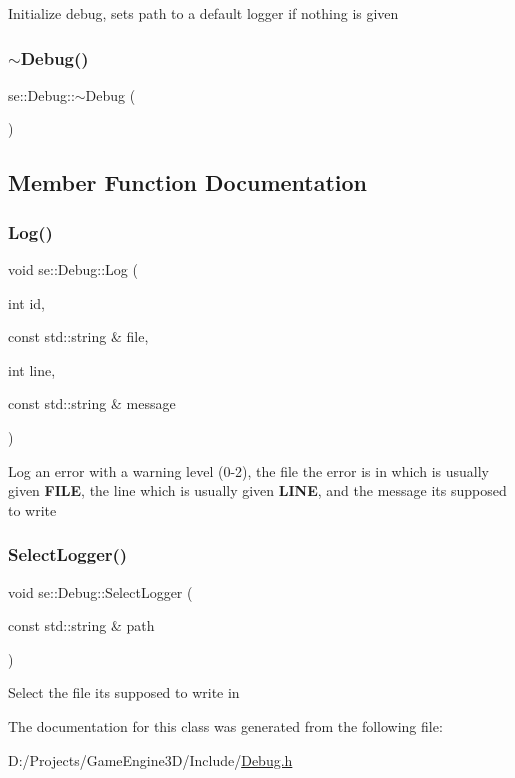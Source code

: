 Initialize debug, sets path to a default logger if nothing is given \mbox{\label{classse_1_1_debug_a2ff6371c83b2a8918b15907bd1491ac9}} 
\subsubsection{\texorpdfstring{$\sim$\+Debug()}{~Debug()}}
{\footnotesize\ttfamily se\+::\+Debug\+::$\sim$\+Debug (\begin{DoxyParamCaption}{ }\end{DoxyParamCaption})}



\subsection{Member Function Documentation}
\mbox{\label{classse_1_1_debug_a682e9ff37514ccccfd063a1aff942e2d}} 
\subsubsection{\texorpdfstring{Log()}{Log()}}
{\footnotesize\ttfamily void se\+::\+Debug\+::\+Log (\begin{DoxyParamCaption}\item[{int}]{id,  }\item[{const std\+::string \&}]{file,  }\item[{int}]{line,  }\item[{const std\+::string \&}]{message }\end{DoxyParamCaption})}

Log an error with a warning level (0-\/2), the file the error is in which is usually given {\bfseries F\+I\+LE}, the line which is usually given {\bfseries L\+I\+NE}, and the message it\textquotesingle{}s supposed to write \mbox{\label{classse_1_1_debug_ab97d44dca8606c2be2cb709f7e82be09}} 
\subsubsection{\texorpdfstring{Select\+Logger()}{SelectLogger()}}
{\footnotesize\ttfamily void se\+::\+Debug\+::\+Select\+Logger (\begin{DoxyParamCaption}\item[{const std\+::string \&}]{path }\end{DoxyParamCaption})}

Select the file it\textquotesingle{}s supposed to write in 

The documentation for this class was generated from the following file\+:\begin{DoxyCompactItemize}
\item 
D\+:/\+Projects/\+Game\+Engine3\+D/\+Include/\mbox{\hyperlink{_debug_8h}{Debug.\+h}}\end{DoxyCompactItemize}
